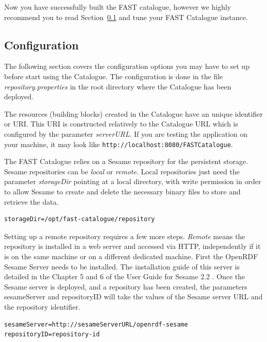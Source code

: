 \documentclass{fast_latex}
\begin{document}
Now you have successfully built the FAST catalogue, however we highly recommend you to read Section~\ref{sub:configuration} and tune your FAST Catalogue instance.


\subsection{Configuration} %
\label{sub:configuration}

The following section covers the configuration options you may have to set up before start using the Catalogue. The configuration is done in the file \emph{repository.properties} in the root directory where the Catalogue has been deployed.

The resources (building blocks) created in the Catalogue have an unique identifier or URI. This URI is constructed relatively to the Catalogue URL which is configured by the parameter \emph{serverURL}. If you are testing the application on your machine, it may look like \verb|http://localhost:8080/FASTCatalogue|.

The FAST Catalogue relies on a Sesame repository for the persistent storage. Sesame repositories can be \emph{local} or \emph{remote}. Local repositories just need the parameter \emph{storageDir} pointing at a local directory, with write permission in order to allow Sesame to create and delete the necessary binary files to store and retrieve the data.

\begin{verbatim}
storageDir=/opt/fast-catalogue/repository
\end{verbatim}

Setting up a remote repository requires a few more steps. \emph{Remote} means the repository is installed in a web server and accessed via HTTP, independently if it is on the same machine or on a different dedicated machine. First the OpenRDF Sesame Server needs to be installed. The installation guide of this server is detailed in the Chapter 5 and 6 of the User Guide for Sesame 2.2 \cite{sesame2.2}. Once the Sesame server is deployed, and a repository has been created, the parameters sesameServer and repositoryID will take the values of the Sesame server URL and the repository identifier.

\begin{verbatim}
sesameServer=http://sesameServerURL/openrdf-sesame
repositoryID=repository-id
\end{verbatim}
\end{document}
